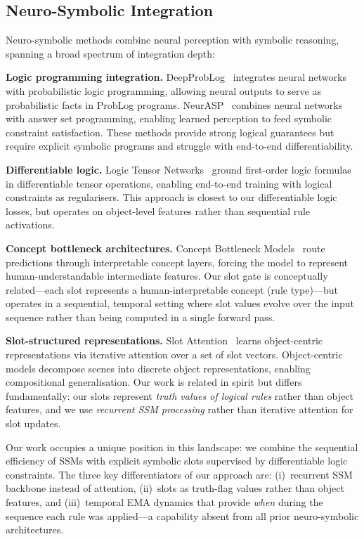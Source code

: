 \documentclass[conference]{IEEEtran}
\begin{document}
\subsection{Neuro-Symbolic Integration}

Neuro-symbolic methods combine neural perception with symbolic
reasoning, spanning a broad spectrum of integration depth:

\textbf{Logic programming integration.}
DeepProbLog~\cite{manhaeve2018deepproblog} integrates neural
networks with probabilistic logic programming, allowing neural
outputs to serve as probabilistic facts in ProbLog programs.
NeurASP~\cite{yang2020neurasp} combines neural networks with
answer set programming, enabling learned perception to feed
symbolic constraint satisfaction.  These methods provide strong
logical guarantees but require explicit symbolic programs and
struggle with end-to-end differentiability.

\textbf{Differentiable logic.}
Logic Tensor Networks~\cite{badreddine2022ltn} ground
first-order logic formulas in differentiable tensor operations,
enabling end-to-end training with logical constraints as
regularisers.  This approach is closest to our differentiable
logic losses, but operates on object-level features rather than
sequential rule activations.

\textbf{Concept bottleneck architectures.}
Concept Bottleneck Models~\cite{koh2020cbm} route predictions
through interpretable concept layers, forcing the model to
represent human-understandable intermediate features.  Our slot
gate is conceptually related---each slot represents a
human-interpretable concept (rule type)---but operates in a
sequential, temporal setting where slot values evolve over the
input sequence rather than being computed in a single forward
pass.

\textbf{Slot-structured representations.}
Slot Attention~\cite{locatello2020slot} learns object-centric
representations via iterative attention over a set of slot vectors.
Object-centric models decompose scenes into discrete object
representations, enabling compositional generalisation.  Our work
is related in spirit but differs fundamentally: our slots represent
\emph{truth values of logical rules} rather than object features,
and we use \emph{recurrent SSM processing} rather than iterative
attention for slot updates.

Our work occupies a unique position in this landscape: we combine
the sequential efficiency of SSMs with explicit symbolic slots
supervised by differentiable logic constraints.  The three key
differentiators of our approach are: (i)~recurrent SSM backbone
instead of attention, (ii)~slots as truth-flag values rather than
object features, and (iii)~temporal EMA dynamics that provide
\emph{when} during the sequence each rule was applied---a
capability absent from all prior neuro-symbolic architectures.
\end{document}
